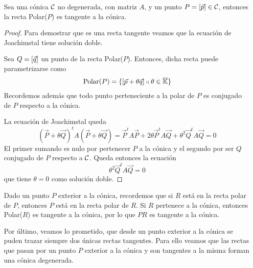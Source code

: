 \begin{lem}
	Sea una cónica $\mathcal{C}$ no degenerada, con matriz $A$, y un punto $P=\left [ \vec{p} \right ]\in \mathcal{C}$, entonces la recta Polar($P$) es tangente a la cónica.
\end{lem}
\begin{proof}
	Para demostrar que es una recta tangente veamos que la ecuación de Joachimstal tiene solución doble.
	
	Sea $Q=\left [ \vec{q} \right ]$ un punto de la recta Polar($P$). Entonces, dicha recta puede parametrizarse como 
	\[\text{Polar($P$)}=\{\left [ \vec{p}+\theta\vec{q} \right ]\shortparallel\theta\in\overline{\mathbb{K}}\}\]
	Recordemos además que todo punto perteneciente a la polar de $P$ es conjugado de $P$ respecto a la cónica.
	
	La ecuación de Joachimstal queda
	\begin{equation*}
	(\vec{P}+\theta \vec{Q})^tA(\vec{P}+\theta \vec{Q})=\vec{P}^tA\vec{P}+2\theta \vec{P}^tA\vec{Q}+\theta^2\vec{Q}^tA\vec{Q}=0
	\end{equation*}
	El primer sumando es nulo por pertenecer $P$ a la cónica y el segundo por ser $Q$ conjugado de $P$ respecto a $\mathcal{C}$. Queda entonces la ecuación
	\[\theta^2\vec{Q}^tA\vec{Q}=0\]
	que tiene $\theta=0$ como solución doble.
\end{proof}
\begin{obs}
	Dado un punto $P$ exterior a la cónica, recordemos que si $R$ está en la recta polar de $P$, entonces $P$ está en la recta polar de $R$. Si $R$ pertenece a la cónica, entonces Polar($R$) es tangente a la cónica, por lo que $PR$ es tangente a la cónica.
\end{obs}

Por último, veamos lo prometido, que desde un punto exterior a la cónica se puden trazar siempre dos únicas rectas tangentes. Para ello veamos que las rectas que pasan por un punto $P$ exterior a la cónica y son tangentes a la misma forman una cónica degenerada.

